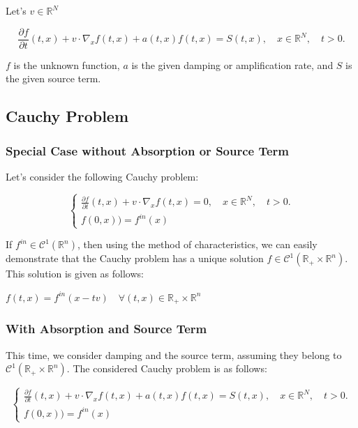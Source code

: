 \documentclass[a4paper, 11pt]{article}
\begin{document}
Let's $v \in \mathbb{R}^N$

\begin{equation} \label{transport}
	\frac{\partial f}{\partial t}(t,x)+v \cdot \nabla_x f(t,x) + a(t,x)f(t,x) = S(t,x), \quad x \in \mathbb{R}^N, \quad t>0.
\end{equation}


$f$ is the unknown function, $a$ is the given damping or amplification rate, and $S$ is the given source term.

\subsection{Cauchy Problem}
\subsubsection{Special Case without Absorption or Source Term}

Let's consider the following Cauchy problem:

\[
\begin{cases}
	\frac{\partial f}{\partial t}(t,x)+v \cdot \nabla_x f(t,x)=0, \quad x \in \mathbb{R}^N, \quad t>0.\\
	f(0,x)) = f^{in}(x)
\end{cases}
\]

If $f^{in} \in \mathcal{C}^1(\mathbb{R}^n)$, then using the method of characteristics, we can easily demonstrate that the Cauchy problem has a unique solution $f \in \mathcal{C}^1(\mathbb{R}_+ \times \mathbb{R}^n)$. This solution is given as follows:





$\boxed{f(t,x)=f^{in}(x-tv) \quad \forall (t,x) \in \mathbb{R}_+ \times \mathbb{R}^n }$




\subsubsection{With Absorption and Source Term}

This time, we consider damping and the source term, assuming they belong to $\mathcal{C}^1(\mathbb{R}_+ \times \mathbb{R}^n)$. The considered Cauchy problem is as follows:


\[
\begin{cases}
	\frac{\partial f}{\partial t}(t,x)+v \cdot \nabla_x f(t,x) + a(t,x)f(t,x) = S(t,x), \quad x \in \mathbb{R}^N, \quad t>0.\\
	f(0,x)) = f^{in}(x)
\end{cases}
\]
\end{document}
